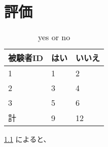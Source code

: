 \chapter{評価}

\begin{table}[h]
    \caption{yes or no}
    \label{table:yes-or-no}
    \centering
    \begin{minipage}{50zw}\centering\begin{tabular}{l|ll}
      \hline
      被験者ID & はい & いいえ \\
      \hline \hline
      1 & 1 & 2 \\
      2 & 3 & 4 \\
      3 & 5 & 6 \\
      \hline \hline
      計 & 9 & 12 \\
    \end{tabular}\end{minipage}
\end{table}

\ref{table:yes-or-no} によると、

